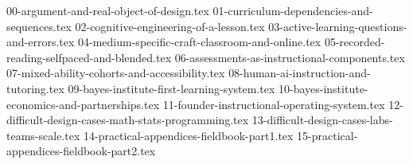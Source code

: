 
{00-argument-and-real-object-of-design.tex}
{01-curriculum-dependencies-and-sequences.tex}
{02-cognitive-engineering-of-a-lesson.tex}
{03-active-learning-questions-and-errors.tex}
{04-medium-specific-craft-classroom-and-online.tex}
{05-recorded-reading-selfpaced-and-blended.tex}
{06-assessments-as-instructional-components.tex}
{07-mixed-ability-cohorts-and-accessibility.tex}
{08-human-ai-instruction-and-tutoring.tex}
{09-bayes-institute-first-learning-system.tex}
{10-bayes-institute-economics-and-partnerships.tex}
{11-founder-instructional-operating-system.tex}
{12-difficult-design-cases-math-stats-programming.tex}
{13-difficult-design-cases-labs-teams-scale.tex}
{14-practical-appendices-fieldbook-part1.tex}
{15-practical-appendices-fieldbook-part2.tex}
